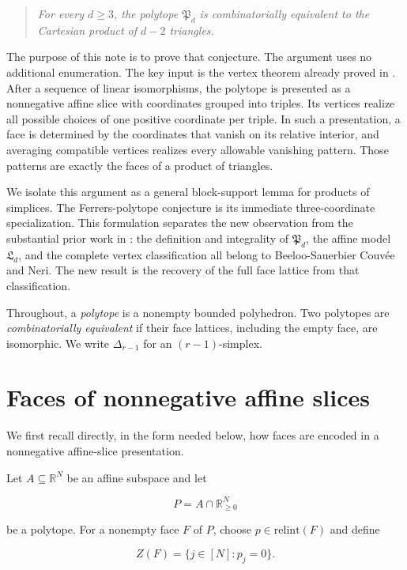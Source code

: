 \documentclass[11pt]{article}
\theoremstyle{remark}
\numberwithin{equation}{section}
\begin{document}
\begin{quote}\itshape
For every $d\geq 3$, the polytope $\mathfrak P_d$ is combinatorially
equivalent to the Cartesian product of $d-2$ triangles.
\end{quote}


The purpose of this note is to prove that conjecture. The argument uses no
additional enumeration. The key input is the vertex theorem already proved
in \cite[Proposition 5.25]{couvee2026}. After a sequence of linear isomorphisms, the
polytope is presented as a nonnegative affine slice with coordinates grouped
into triples. Its vertices realize all possible choices of one positive
coordinate per triple. In such a presentation, a face is determined by the
coordinates that vanish on its relative interior, and averaging compatible
vertices realizes every allowable vanishing pattern. Those patterns are
exactly the faces of a product of triangles.

We isolate this argument as a general block-support lemma for products of
simplices. The Ferrers-polytope conjecture is its immediate three-coordinate
specialization. This formulation separates the new observation from the
substantial prior work in \cite{couvee2026}: the definition and integrality of
$\mathfrak P_d$, the affine model $\mathfrak L_d$, and the complete vertex
classification all belong to Beeloo-Sauerbier Couvée and Neri. The new result
is the recovery of the full face lattice from that classification.

Throughout, a \emph{polytope} is a nonempty bounded polyhedron. Two polytopes are
\emph{combinatorially equivalent} if their face lattices, including the empty face,
are isomorphic. We write $\Delta_{r-1}$ for an $(r-1)$-simplex.

\section{Faces of nonnegative affine slices}


We first recall directly, in the form needed below, how faces are encoded in
a nonnegative affine-slice presentation.

Let $A\subseteq\mathbb R^N$ be an affine subspace and let

\nopagebreak[4]
\[
P=A\cap\mathbb R_{\geq 0}^{N}
\]

be a polytope. For a nonempty face $F$ of $P$, choose
$p\in\mathrm{relint}(F)$ and define

\nopagebreak[4]
\[
Z(F)=\{j\in[N]:p_j=0\}.
\]
\end{document}
